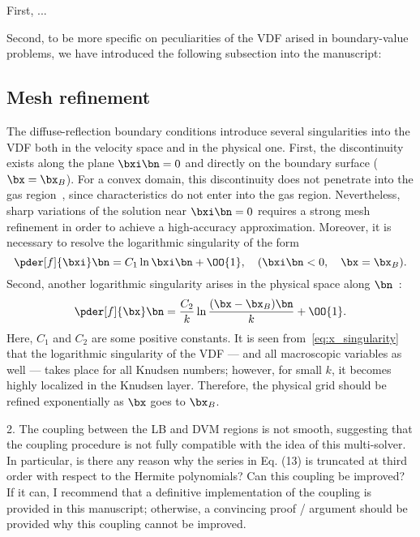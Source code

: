 \documentclass{article}
\begin{document}
\begin{leftbar}
\end{leftbar}

First, ...

Second, to be more specific on peculiarities of the VDF arised in boundary-value problems,
we have introduced the following subsection into the manuscript:
\begin{leftbar}
    \subsection*{Mesh refinement}
    The diffuse-reflection boundary conditions introduce several singularities into the VDF
    both in the velocity space and in the physical one.
    First, the discontinuity exists along the plane \(\bxi\bn=0\) and directly on the boundary surface (\(\bx=\bx_B\)).
    For a convex domain, this discontinuity does not penetrate into the gas region~\cite{Kim2011, Guo2017},
    since characteristics do not enter into the gas region.
    Nevertheless, sharp variations of the solution near \(\bxi\bn=0\) requires a strong mesh refinement
    in order to achieve a high-accuracy approximation.
    Moreover, it is necessary to resolve the logarithmic singularity of the form~\cite{Takata2016}
    \begin{equation}\label{eq:xi_singularity}
        \pder[f]{\bxi}\bn = C_1\ln\bxi\bn + \OO{1}, \quad (\bxi\bn<0, \quad \bx=\bx_B).
    \end{equation}
    Second, another logarithmic singularity arises in the physical space along \(\bn\)~\cite{Takata2014}:
    \begin{equation}\label{eq:x_singularity}
        \pder[f]{\bx}\bn = \frac{C_2}{k}\ln\frac{(\bx-\bx_B)\bn}{k} + \OO{1}.
    \end{equation}
    Here, \(C_1\) and \(C_2\) are some positive constants.
    It is seen from~\eqref{eq:x_singularity} that the logarithmic singularity of the VDF
    --- and all macroscopic variables as well --- takes place for all Knudsen numbers;
    however, for small \(k\), it becomes highly localized in the Knudsen layer.
    Therefore, the physical grid should be refined exponentially as \(\bx\) goes to \(\bx_B\).
\end{leftbar}

\begin{quoting}
    2. The coupling between the LB and DVM regions is not
    smooth, suggesting that the coupling procedure is not
    fully compatible with the idea of this multi-solver.
    In particular, is there any reason why the series in
    Eq. (13) is truncated at third order with respect to
    the Hermite polynomials? Can this coupling be improved?
    If it can, I recommend that a definitive implementation
    of the coupling is provided in this manuscript; otherwise,
    a convincing proof / argument should be provided why this
    coupling cannot be improved.
\end{quoting}
\end{document}
